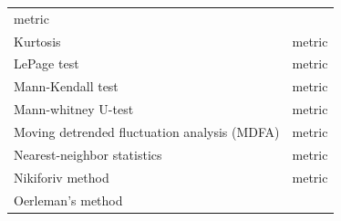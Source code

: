\documentclass[12pt,twoside,openany]{reedthesis}
\begin{document}
\begin{longtable}[]{@{}lc@{}}
\begin{minipage}[t]{0.35\columnwidth}
metric\strut
\end{minipage}\tabularnewline
\begin{minipage}[t]{0.43\columnwidth}\raggedright
Kurtosis\strut
\end{minipage} & \begin{minipage}[t]{0.35\columnwidth}\centering
metric\strut
\end{minipage}\tabularnewline
\begin{minipage}[t]{0.43\columnwidth}\raggedright
LePage test\strut
\end{minipage} & \begin{minipage}[t]{0.35\columnwidth}\centering
metric\strut
\end{minipage}\tabularnewline
\begin{minipage}[t]{0.43\columnwidth}\raggedright
Mann-Kendall test\strut
\end{minipage} & \begin{minipage}[t]{0.35\columnwidth}\centering
metric\strut
\end{minipage}\tabularnewline
\begin{minipage}[t]{0.43\columnwidth}\raggedright
Mann-whitney U-test\strut
\end{minipage} & \begin{minipage}[t]{0.35\columnwidth}\centering
metric\strut
\end{minipage}\tabularnewline
\begin{minipage}[t]{0.43\columnwidth}\raggedright
Moving detrended fluctuation
analysis (MDFA)\strut
\end{minipage} & \begin{minipage}[t]{0.35\columnwidth}\centering
metric\strut
\end{minipage}\tabularnewline
\begin{minipage}[t]{0.43\columnwidth}\raggedright
Nearest-neighbor statistics\strut
\end{minipage} & \begin{minipage}[t]{0.35\columnwidth}\centering
metric\strut
\end{minipage}\tabularnewline
\begin{minipage}[t]{0.43\columnwidth}\raggedright
Nikiforiv method\strut
\end{minipage} & \begin{minipage}[t]{0.35\columnwidth}\centering
metric\strut
\end{minipage}\tabularnewline
\begin{minipage}[t]{0.43\columnwidth}\raggedright
Oerleman's method\strut

\end{minipage}
\end{longtable}
\end{document}

